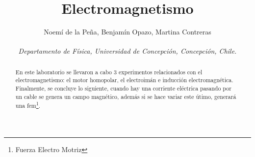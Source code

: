 \documentclass[]{article}
\title{Electromagnetismo}
\author{Noemí de la Peña, Benjamín Opazo, Martina Contreras \\ \\
 \textit{ Departamento de Física, Universidad de Concepción, Concepción, Chile. }}
\date{}
\begin{document}
\maketitle 



    


\begin{abstract}
    En este laboratorio se llevaron a cabo 3 experimentos relacionados con el electromagnetismo:  el motor homopolar, el electroimán e inducción electromagnética.
Finalmente, se concluye lo siguiente,  cuando hay una corriente eléctrica pasando por un cable se genera un campo magnético, además si se hace variar este útimo, generará una fem\footnote[1]{Fuerza Electro Motriz}.

\end{abstract}
\end{document}
